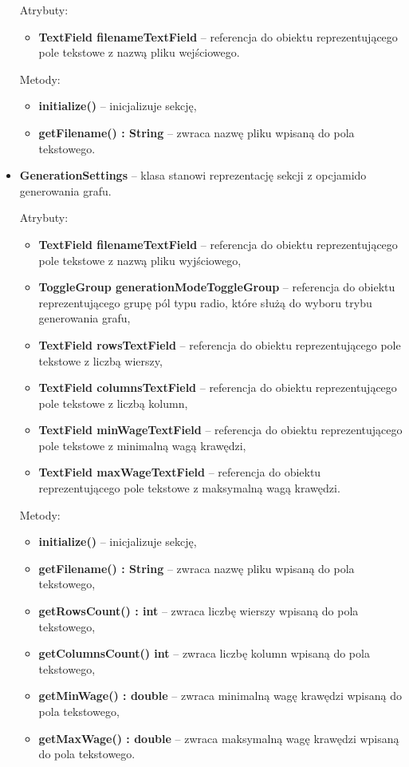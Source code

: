 \documentclass{article}
\begin{document}
\begin{itemize}
    Atrybuty:
    \begin{itemize}
        \item \textbf{TextField filenameTextField} -- referencja do obiektu reprezentującego pole tekstowe z nazwą pliku wejściowego.
    \end{itemize}
    
    Metody:
    \begin{itemize}
        \item \textbf{initialize()} -- inicjalizuje sekcję,
        \item \textbf{getFilename() : String} -- zwraca nazwę pliku wpisaną do pola tekstowego.
    \end{itemize}
    
\newpage
    
    \item \textbf{GenerationSettings} -- klasa stanowi reprezentację sekcji z opcjami\linebreak do generowania grafu.
    
    Atrybuty:
    \begin{itemize}
        \item \textbf{TextField filenameTextField} -- referencja do obiektu reprezentującego pole tekstowe z nazwą pliku wyjściowego,
        \item \textbf{ToggleGroup generationModeToggleGroup} -- referencja do obiektu reprezentującego grupę pól typu radio, które służą do wyboru trybu generowania grafu,
        \item \textbf{TextField rowsTextField} -- referencja do obiektu reprezentującego pole tekstowe z liczbą wierszy,
        \item \textbf{TextField columnsTextField} -- referencja do obiektu reprezentującego pole tekstowe z liczbą kolumn,
        \item \textbf{TextField minWageTextField} -- referencja do obiektu reprezentującego pole tekstowe z minimalną wagą krawędzi,
        \item \textbf{TextField maxWageTextField} -- referencja do obiektu reprezentującego pole tekstowe z maksymalną wagą krawędzi.
    \end{itemize}
    
    Metody:
    \begin{itemize}
        \item \textbf{initialize()} -- inicjalizuje sekcję,
        \item \textbf{getFilename() : String} -- zwraca nazwę pliku wpisaną do pola tekstowego,
        \item \textbf{getRowsCount() : int} -- zwraca liczbę wierszy wpisaną do pola tekstowego,
        \item \textbf{getColumnsCount() int} -- zwraca liczbę kolumn wpisaną do pola tekstowego,
        \item \textbf{getMinWage() : double} -- zwraca minimalną wagę krawędzi wpisaną do pola tekstowego,
        \item \textbf{getMaxWage() : double} -- zwraca maksymalną wagę krawędzi wpisaną do pola tekstowego.
    \end{itemize}
    

\end{itemize}
\end{document}
